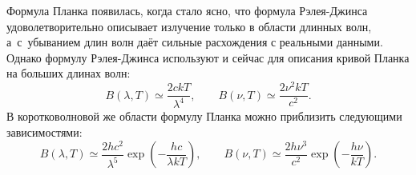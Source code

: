 Формула Планка появилась, когда стало ясно, что формула Рэлея-Джинса удоволетворительно описывает излучение только в области длинных волн, а~с~убыванием длин волн даёт сильные расхождения с реальными данными. Однако формулу Рэлея-Джинса используют и сейчас для описания кривой Планка на больших длинах волн:
\begin{equation}
	B(\lambda, T) \simeq \frac{2 c k T}{\lambda^4}, \quad\quad B(\nu, T) \simeq \frac{2 \nu^2 k T}{c^2}.
\label{Ray-Jean}
\end{equation}
В коротковолновой же области формулу Планка можно приблизить следующими зависимостями:
\begin{equation}
B ( \lambda, T) \simeq \frac{2 h c^2}{\lambda^5} \exp \left( -\frac{h c}{\lambda k T}\right), \quad \quad B( \nu, T ) \simeq \frac{2 h \nu^3}{c^2} \exp \left( -\frac{h \nu}{k T} \right).
\end{equation}
